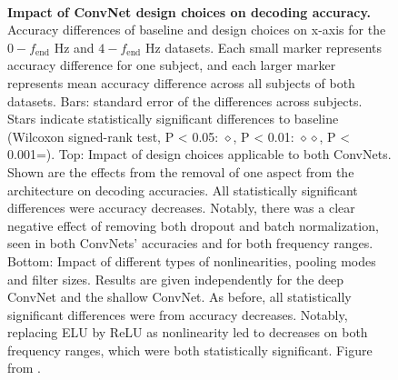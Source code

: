 \begin{figure}[htb]
    \captionsetup[subfigure]{labelformat=empty}
    \myfloatalign
     \\
    \caption[Impact of ConvNet design choices on decoding accuracy]{
    \textbf{Impact of ConvNet design choices on decoding accuracy.} 
Accuracy differences of baseline and design choices on x-axis for the $0-f_\textrm{end}$ Hz and $4-f_\textrm{end}$ Hz datasets. 
Each small marker represents accuracy difference for one subject, and each larger marker represents mean accuracy difference across all subjects of both datasets. Bars: standard error of the differences across subjects. 
Stars indicate statistically significant differences to baseline (Wilcoxon signed-rank test, P < 0.05: $\diamond$\*, P < 0.01: $\diamond\diamond$\*\*, P < 0.001=\*\*\*). Top: Impact of design choices applicable to both ConvNets. 
Shown are the effects from the removal of one aspect from the architecture on decoding accuracies. All statistically significant differences were accuracy decreases.
Notably, there was a clear negative effect of removing both dropout and batch normalization, seen in both ConvNets' accuracies and for both frequency ranges. Bottom: Impact of different types of nonlinearities, pooling modes and filter sizes. Results are given independently for the deep ConvNet and the shallow ConvNet.
As before, all statistically significant differences were from accuracy decreases. Notably, replacing ELU by ReLU as nonlinearity led to decreases on both frequency ranges, which were both statistically significant. 
Figure from \cite{schirrmeisterdeephbm2017}.
}
\label{design-choices-fig}
\end{figure}

